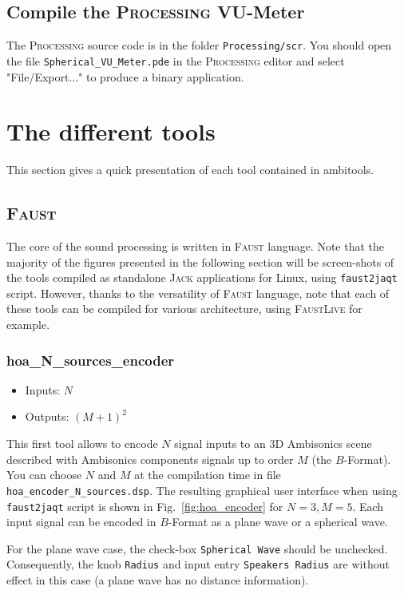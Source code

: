 \documentclass[10pt,a4paper]{article}
\begin{document}
\subsection{Compile the \textsc{Processing} VU-Meter}
The \textsc{Processing} source code is in the folder \lstinline'Processing/scr'. You should open the file \lstinline'Spherical_VU_Meter.pde' in the \textsc{Processing} editor and select "File/Export..." to produce a binary application.

\section{The different tools}
This section gives a quick presentation of each tool contained in ambitools. 
\subsection{\textsc{Faust}}
The core of the sound processing is written in \textsc{Faust} language. Note that the majority of the figures presented in the following section will be screen-shots of the tools compiled as standalone \textsc{Jack} applications for Linux, using \lstinline'faust2jaqt' script. However, thanks to the versatility of \textsc{Faust} language, note that each of these tools can be compiled for various architecture, using \textsc{FaustLive} for example. 

\pagebreak
\subsubsection{hoa\_N\_sources\_encoder}
\label{sec:hoa_encoder}
\begin{itemize}
\item Inputs: $N$
\item Outputs: $(M+1)^2$
\end{itemize}

This first tool allows to encode $N$ signal inputs to an 3D Ambisonics scene described with Ambisonics components signals up to order $M$ (the $B$-Format). You can choose $N$ and $M$ at the compilation time in file \lstinline'hoa_encoder_N_sources.dsp'. The resulting graphical user interface when using \lstinline'faust2jaqt' script is shown in Fig.~\ref{fig:hoa_encoder} for $N=3, M=5$.
Each input signal can be encoded in $B$-Format as a plane wave or a spherical wave. 

For the plane wave case, the check-box \lstinline'Spherical Wave' should be unchecked. Consequently, the knob \lstinline'Radius' and input entry \lstinline'Speakers Radius' are without effect in this case (a plane wave has no distance information).
\end{document}
